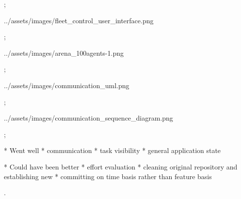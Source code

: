 \pg;


\centerline{\picw=16cm \inspic ../assets/images/fleet_control_user_interface.png }

\pg;



\centerline{\picw=14cm \inspic ../assets/images/arena_100agents-1.png }

\pg;



\centerline{\picw=16cm \inspic ../assets/images/communication_uml.png }

\pg;


\centerline{\picw=16cm \inspic ../assets/images/communication_sequence_diagram.png }

\pg;



* Went well
\typosize[14/14]
\begitems
* communication
* task visibility
* general application state
\enditems

* Could have been better
\typosize[14/14]
\begitems
* effort evaluation
* cleaning original repository and establishing new
* committing on time basis rather than feature basis
\enditems

\pg.

